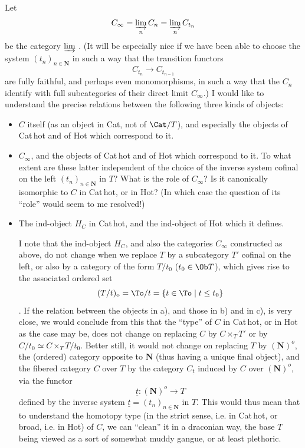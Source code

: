 Let
\[
C_{\infty} = \varinjlim_{n} C_{n} = \varinjlim_{n} C_{t_{n}}
\]
be the category $\varinjlim$ . (It will be especially nice if we have been able to choose the system $(t_{n})_{n\in\mathbf{N}}$ in such a way that the transition functors
\[
C_{t_{n}} \longrightarrow C_{t_{n-1}}
\]
are fully faithful, and perhaps even monomorphisms, in such a way that the $C_{n}$ identify with full subcategories of their direct limit $C_{\infty}$.) I would like to understand the precise relations between the following three kinds of objects:

\begin{itemize}[leftmargin=2.5em]
\item[\circled{a}] $C$ itself (as an object in Cat, not of $\Cat/T$), and especially the objects of Cat\,hot and of Hot which correspond to it.

\item[\circled{b}] $C_{\infty}$, and the objects of Cat\,hot and of Hot which correspond to it. To what extent are these latter %
independent %
of the choice of the inverse system cofinal on the left $(t_{n})_{n\in\mathbf{N}}$ in $T$? What is the role of $C_{\infty}$? Is it canonically isomorphic to $C$ in Cat\,hot, or in Hot? (In which case the question of its ``role'' would seem to me resolved!)

\item[\circled{c}] The ind-object %
$H_{C}$ in Cat\,hot, and the ind-object of Hot which it defines.

I note that the ind-object $H_{C}$, and also the categories $C_{\infty}$ constructed as above, do not change when we replace $T$ by a subcategory $T'$ cofinal on the left, or also by a category of the form $T/t_{0}$ ($t_{0} \in \Ob T$), which gives rise to the associated ordered set %
\[
(T/t)_{\mathrm{o}} = \To/t = \{t \in \To \mid t \leq t_{0}\}
\]
. If the relation between the objects in a), and those in b) and in c), is very close, we would conclude from this %
that the ``type'' of $C$ in Cat\,hot, or in Hot as the case may be, does not change on replacing $C$ by
$C \times_{T} T'$ or by $C/t_{0} \simeq C \times_{T} T/t_{0}$. Better still, it would not change on replacing $T$ by $(\mathbf{N})^{o}$, the (ordered) category opposite to $\mathbf{N}$ (thus having a unique final object), and the fibered category $C$ over $T$ by the category $C_{\underline{t}}$ induced by $C$ over $(\mathbf{N})^{o}$, via the functor
\[
\underline{t} : (\mathbf{N})^{o} \longrightarrow T
\]
defined by the inverse system $\underline{t} = (t_{n})_{n\in\mathbf{N}}$ in $T$. This would thus mean that to understand the homotopy type (in the strict sense, i.e. in Cat\,hot, or broad, i.e. in Hot) of $C$, we can ``clean'' it in a draconian way, the base $T$ being viewed as a sort of somewhat muddy gangue, or at least plethoric.


\end{itemize}
